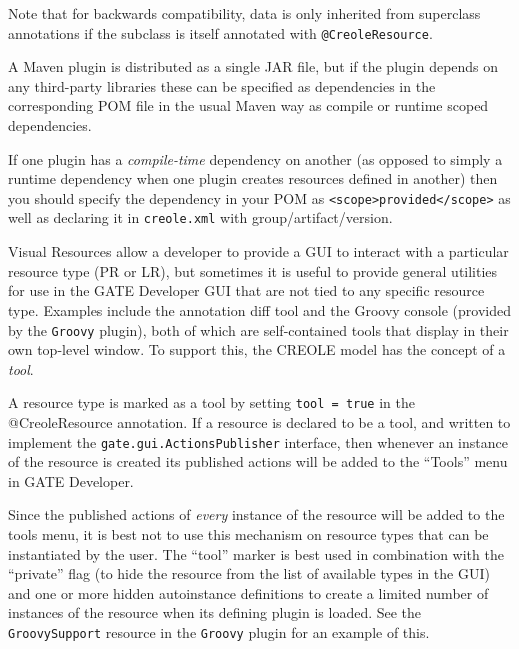 Note that for backwards compatibility, data is only inherited from superclass
annotations if the subclass is itself annotated with \verb|@CreoleResource|.


A Maven plugin is distributed as a single JAR file, but if the plugin depends
on any third-party libraries these can be specified as dependencies in the
corresponding POM file in the usual Maven way as compile or runtime scoped
dependencies.

If one plugin has a \emph{compile-time} dependency on another (as opposed to
simply a runtime dependency when one plugin creates resources defined in
another) then you should specify the dependency in your POM as
\verb|<scope>provided</scope>| as well as declaring it in {\tt creole.xml} with
group/artifact/version.


Visual Resources allow a developer to provide a GUI to interact with a
particular resource type (PR or LR), but sometimes it is useful to provide
general utilities for use in the GATE Developer GUI that are not tied to any
specific resource type.  Examples include the annotation diff tool and the
Groovy console (provided by the \verb|Groovy| plugin), both of which are
self-contained tools that display in their own top-level window.  To support
this, the CREOLE model has the concept of a {\em tool}.

A resource type is marked as a tool by setting \verb|tool = true| in the
@CreoleResource annotation.  If a resource is declared to
be a tool, and written to implement the \verb|gate.gui.ActionsPublisher|
interface, then whenever an instance of the resource is created its published
actions will be added to the ``Tools'' menu in GATE Developer.

Since the published actions of {\em every} instance of the resource will be
added to the tools menu, it is best not to use this mechanism on resource types
that can be instantiated by the user.  The ``tool'' marker is best used in
combination with the ``private'' flag (to hide the resource from the list of
available types in the GUI) and one or more hidden autoinstance definitions
to create a limited number of instances of the resource when its defining
plugin is loaded.  See the \verb|GroovySupport| resource in the \verb|Groovy|
plugin for an example of this.

